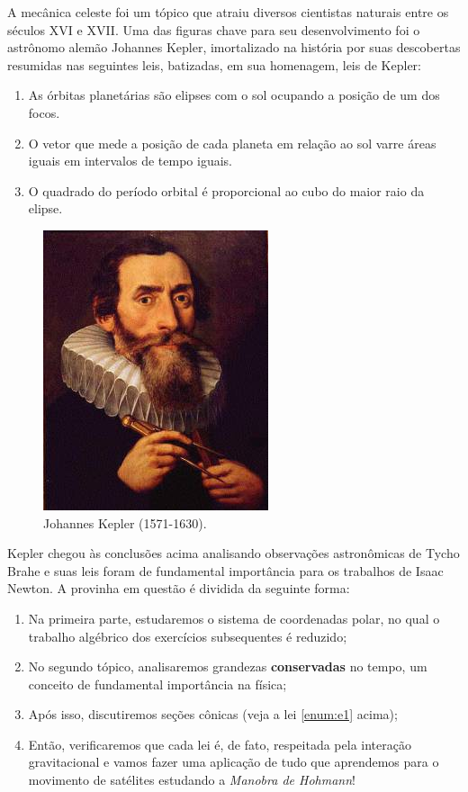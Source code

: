 \documentclass[]{IMTexam}
\author{Isabella B.}
\date{}
\begin{document}
\maketitle

A mecânica celeste foi um tópico que atraiu diversos cientistas naturais entre os séculos XVI e XVII. Uma das figuras chave para seu desenvolvimento foi o astrônomo alemão Johannes Kepler, imortalizado na história por suas descobertas resumidas nas seguintes leis, batizadas, em sua homenagem, leis de Kepler:

\begin{enumerate}[label=(\Roman*)]
	\item \label{enum:e1} As órbitas planetárias são elipses com o sol ocupando a posição de um dos focos.
	\item \label{enum:e2} O vetor que mede a posição de cada planeta em relação ao sol varre áreas iguais em intervalos de tempo iguais.
	\item \label{enum:e3} O quadrado do período orbital é proporcional ao cubo do maior raio da elipse.
\end{enumerate}

\begin{figure}[H]
	\centering
	\includegraphics[width=0.2\linewidth]{screenshot001}
	\caption{Johannes Kepler (1571-1630).}
	\label{fig:JohanK}
\end{figure}

Kepler chegou às conclusões acima analisando observações astronômicas de Tycho Brahe e suas leis foram de fundamental importância para os trabalhos de Isaac Newton. A provinha em questão é dividida da seguinte forma:

\begin{enumerate}
	\item Na primeira parte, estudaremos o sistema de coordenadas polar, no qual o trabalho algébrico dos exercícios subsequentes é reduzido;
	\item No segundo tópico, analisaremos grandezas \textbf{conservadas} no tempo, um conceito de fundamental importância na física;
	\item Após isso, discutiremos seções cônicas (veja a lei \ref{enum:e1} acima);
	\item Então, verificaremos que cada lei é, de fato, respeitada pela interação gravitacional e vamos fazer uma aplicação de tudo que aprendemos para o movimento de satélites estudando a \textit{Manobra de Hohmann}!
\end{enumerate}
\end{document}
